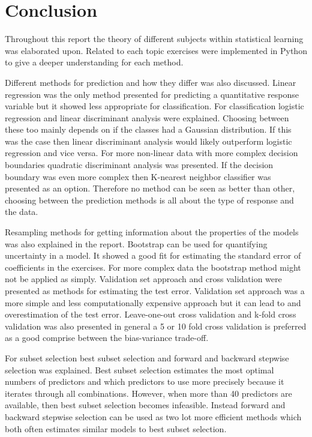 \chapter{Conclusion}
\label{chp:conc}

Throughout this report the theory of different subjects within statistical learning was elaborated upon. Related to each topic exercises were implemented in Python to give a deeper understanding for each method. 

Different methods for prediction and how they differ was also discussed. Linear regression was the only method presented for predicting a quantitative response variable but it showed less appropriate for classification. For classification logistic regression and linear discriminant analysis were explained. Choosing between these too mainly depends on if the classes had a Gaussian distribution. If this was the case then linear discriminant analysis would likely outperform logistic regression and vice versa. For more non-linear data with more complex decision boundaries quadratic discriminant analysis was presented. If the decision boundary was even more complex then K-nearest neighbor classifier was presented as an option. Therefore no method can be seen as better than other, choosing between the prediction methods is all about the type of response and the data.

Resampling methods for getting information about the properties of the models was also explained in the report. Bootstrap can be used for quantifying uncertainty in a model. It showed a good fit for estimating the standard error of coefficients in the exercises. For more complex data the bootstrap method might not be applied as simply.
Validation set approach and cross validation were presented as methods for estimating the test error. Validation set approach was a more simple and less computationally expensive approach but it can lead to and overestimation of the test error. Leave-one-out cross validation and k-fold cross validation was also presented in general a 5 or 10 fold cross validation is preferred as a good comprise between the bias-variance trade-off.

For subset selection best subset selection and forward and backward stepwise selection was explained. Best subset selection estimates the most optimal numbers of predictors and which predictors to use more precisely because it iterates through all combinations. However, when more than 40 predictors are available, then best subset selection becomes infeasible. Instead forward and backward stepwise selection can be used as two lot more efficient methods which both often estimates similar models to best subset selection.

